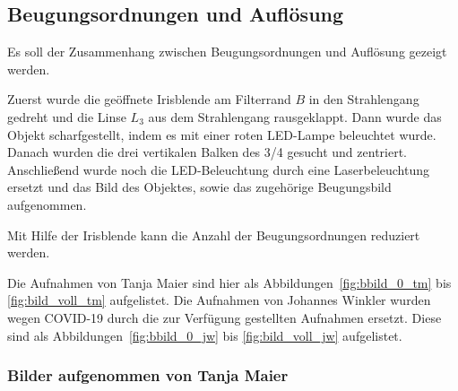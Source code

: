 \documentclass{article}
\begin{document}
\subsection{Beugungsordnungen und Auflösung}

Es soll der Zusammenhang zwischen Beugungsordnungen und Auflösung gezeigt werden. 

Zuerst wurde die geöffnete Irisblende am Filterrand $B$ in den Strahlengang gedreht und die Linse $L_3$ aus dem Strahlengang rausgeklappt. Dann wurde das Objekt scharfgestellt, indem es mit einer roten LED-Lampe beleuchtet wurde. Danach wurden die drei vertikalen Balken des 3/4 gesucht und zentriert. Anschließend wurde noch die LED-Beleuchtung durch eine Laserbeleuchtung ersetzt und das Bild des Objektes, sowie das zugehörige Beugungsbild aufgenommen.

Mit Hilfe der Irisblende kann die Anzahl der Beugungsordnungen reduziert werden.

Die Aufnahmen von Tanja Maier sind hier als Abbildungen~\ref{fig:bbild_0_tm} bis \ref{fig:bild_voll_tm} aufgelistet.
Die Aufnahmen von Johannes Winkler wurden wegen COVID-19 durch die zur Verfügung gestellten Aufnahmen ersetzt. Diese sind als Abbildungen~\ref{fig:bbild_0_jw} bis \ref{fig:bild_voll_jw} aufgelistet.

\subsubsection{Bilder aufgenommen von Tanja Maier}
 
\end{document}
